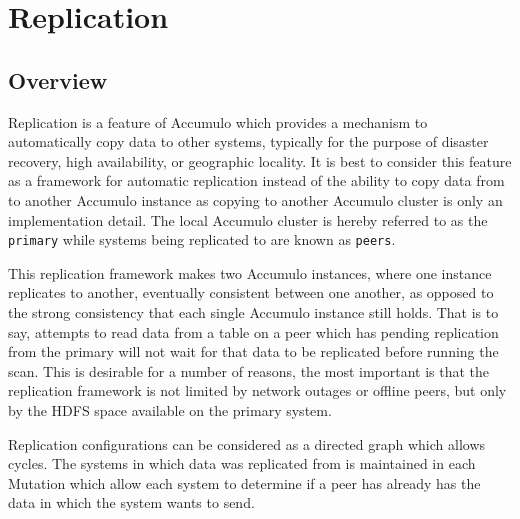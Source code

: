 %
%

\chapter{Replication}

\section{Overview}

Replication is a feature of Accumulo which provides a mechanism to automatically
copy data to other systems, typically for the purpose of disaster recovery,
high availability, or geographic locality. It is best to consider this feature
as a framework for automatic replication instead of the ability to copy data
from to another Accumulo instance as copying to another Accumulo cluster is
only an implementation detail. The local Accumulo cluster is hereby referred
to as the \texttt{primary} while systems being replicated to are known as
\texttt{peers}.

This replication framework makes two Accumulo instances, where one instance
replicates to another, eventually consistent between one another, as opposed
to the strong consistency that each single Accumulo instance still holds. That
is to say, attempts to read data from a table on a peer which has pending replication
from the primary will not wait for that data to be replicated before running the scan.
This is desirable for a number of reasons, the most important is that the replication
framework is not limited by network outages or offline peers, but only by the HDFS
space available on the primary system.

Replication configurations can be considered as a directed graph which allows cycles.
The systems in which data was replicated from is maintained in each Mutation which
allow each system to determine if a peer has already has the data in which
the system wants to send.

